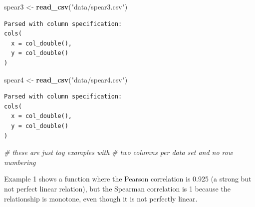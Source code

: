 \documentclass[
]{book}
\newenvironment{Shaded}{\begin{snugshade}}{\end{snugshade}}
\newcommand{\CommentTok}[1]{\textcolor[rgb]{0.56,0.35,0.01}{\textit{#1}}}
\newcommand{\DataTypeTok}[1]{\textcolor[rgb]{0.13,0.29,0.53}{#1}}
\newcommand{\DecValTok}[1]{\textcolor[rgb]{0.00,0.00,0.81}{#1}}
\newcommand{\KeywordTok}[1]{\textcolor[rgb]{0.13,0.29,0.53}{\textbf{#1}}}
\newcommand{\NormalTok}[1]{#1}
\newcommand{\OperatorTok}[1]{\textcolor[rgb]{0.81,0.36,0.00}{\textbf{#1}}}
\newcommand{\StringTok}[1]{\textcolor[rgb]{0.31,0.60,0.02}{#1}}
\begin{document}
\begin{Shaded}
\begin{Highlighting}[]
\NormalTok{spear3 <-}\StringTok{ }\KeywordTok{read_csv}\NormalTok{(}\StringTok{"data/spear3.csv"}\NormalTok{)}
\end{Highlighting}
\end{Shaded}

\begin{verbatim}
Parsed with column specification:
cols(
  x = col_double(),
  y = col_double()
)
\end{verbatim}

\begin{Shaded}
\begin{Highlighting}[]
\NormalTok{spear4 <-}\StringTok{ }\KeywordTok{read_csv}\NormalTok{(}\StringTok{"data/spear4.csv"}\NormalTok{)}
\end{Highlighting}
\end{Shaded}

\begin{verbatim}
Parsed with column specification:
cols(
  x = col_double(),
  y = col_double()
)
\end{verbatim}

\begin{Shaded}
\begin{Highlighting}[]
\CommentTok{# these are just toy examples with}
\CommentTok{# two columns per data set and no row numbering}
\end{Highlighting}
\end{Shaded}

Example 1 shows a function where the Pearson correlation is 0.925 (a strong but not perfect linear relation), but the Spearman correlation is 1 because the relationship is monotone, even though it is not perfectly linear.

\begin{Shaded}
\end{Shaded}
\end{document}

